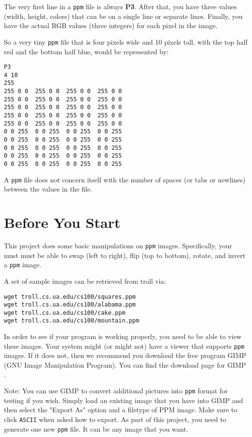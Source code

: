 \documentclass[12pt]{article}
\begin{document}
The very first line in a {\tt ppm} file is always {\bf P3}.  After that, you have
three values (width, height, colors) that can be on a single line or separate lines.
Finally, you have the actual RGB values (three integers) for each pixel in the image.

So a very tiny {\tt ppm} file that is four pixels wide and 10 pixels tall, with the top
half red and the bottom half blue, would be represented by:

\begin{verbatim}
P3
4 10
255
255 0 0  255 0 0  255 0 0  255 0 0
255 0 0  255 0 0  255 0 0  255 0 0
255 0 0  255 0 0  255 0 0  255 0 0
255 0 0  255 0 0  255 0 0  255 0 0
255 0 0  255 0 0  255 0 0  255 0 0
0 0 255  0 0 255  0 0 255  0 0 255
0 0 255  0 0 255  0 0 255  0 0 255
0 0 255  0 0 255  0 0 255  0 0 255
0 0 255  0 0 255  0 0 255  0 0 255
0 0 255  0 0 255  0 0 255  0 0 255
\end{verbatim}

A {\tt ppm} file does not concern itself with the number of spaces (or tabs or newlines)
between the values in the file.

\section*{Before You Start}

This project does some basic manipulations on {\tt ppm} images.  Specifically,
your must must be able to swap (left to right), flip (top to bottom), rotate, and
invert a {\tt ppm} image.

A set of sample images can be retrieved from troll via:

\begin{verbatim}
wget troll.cs.ua.edu/cs100/squares.ppm
wget troll.cs.ua.edu/cs100/alabama.ppm
wget troll.cs.ua.edu/cs100/cake.ppm
wget troll.cs.ua.edu/cs100/mountain.ppm
\end{verbatim}

In order to see if your program is working properly,
you need to be able to view these images.  Your system might (or might not)
have a viewer that supports {\tt ppm} images.  If it does not, then we
recommend you download the free program GIMP (GNU Image Manipulation Program).
You can find the download page for GIMP 
.

Note: You can use GIMP to convert additional pictures into {\tt ppm} format
for testing if you wish.  Simply load an existing image that you have into
GIMP and then select the "Export As" option and a filetype of PPM image.  Make
sure to click {\tt ASCII} when asked how to export.  As part of this project,
you need to generate one new {\tt ppm} file.  It can be any image that you want.
\end{document}
